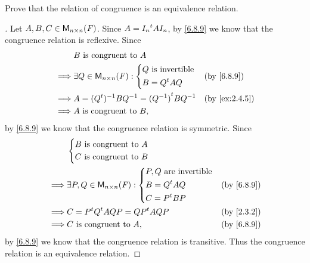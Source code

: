 \exercisesection

\begin{ex}\label{ex:6.8.12}
  Prove that the relation of congruence is an equivalence relation.
\end{ex}

\begin{proof}[]
  Let \(A, B, C \in \ms[n][n][\F]\).
  Since \(A = {I_n}^{t} A I_n\), by \cref{6.8.9} we know that the congruence relation is reflexive.
  Since
  \begin{align*}
             & B \text{ is congruent to } A                                           \\
    \implies & \exists Q \in \ms[n][n][\F] : \begin{dcases}
                                               Q \text{ is invertible} \\
                                               B = \tp{Q} A Q
                                             \end{dcases}        &  & \by{6.8.9}      \\
    \implies & A = (\tp{Q})^{-1} B Q^{-1} = \tp{(Q^{-1})} B Q^{-1} &  & \by{ex:2.4.5} \\
    \implies & A \text{ is congruent to } B,
  \end{align*}
  by \cref{6.8.9} we know that the congruence relation is symmetric.
  Since
  \begin{align*}
             & \begin{dcases}
                 B \text{ is congruent to } A \\
                 C \text{ is congruent to } B
               \end{dcases}                                    \\
    \implies & \exists P, Q \in \ms[n][n][\F] : \begin{dcases}
                                                  P, Q \text{ are invertible} \\
                                                  B = \tp{Q} A Q              \\
                                                  C = \tp{P} B P
                                                \end{dcases} &  & \by{6.8.9}   \\
    \implies & C = \tp{P} \tp{Q} A Q P = \tp{QP} A QP          &  & \by{2.3.2} \\
    \implies & C \text{ is congruent to } A,                   &  & \by{6.8.9}
  \end{align*}
  by \cref{6.8.9} we know that the congruence relation is transitive.
  Thus the congruence relation is an equivalence relation.
\end{proof}

\begin{ex}\label{ex:6.8.13}
\end{ex}
